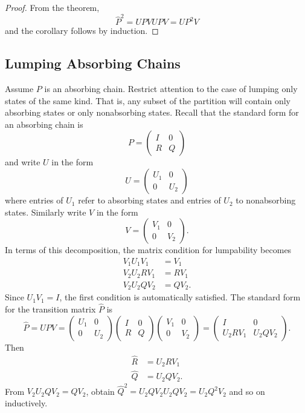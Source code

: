 \documentclass[12pt]{article}
\begin{document}
\begin{proof}
    From the theorem,
    \[
        \hat{P}^2 = U P V U P V = U P^2 V
    \] and the corollary follows by induction.
\end{proof}

\subsection*{Lumping Absorbing Chains}

Assume \( P \) is an absorbing chain.  Restrict attention to the case of
lumping only states of the same kind.  That is, any subset of the
partition will contain only absorbing states or only nonabsorbing
states.  Recall that the standard form for an absorbing chain is
\[
    P =
    \begin{pmatrix}
        I & 0 \\
        R & Q
    \end{pmatrix}
\] and write \( U \) in the form
\[
    U =
    \begin{pmatrix}
        U_1 & 0 \\
        0 & U_{2}
    \end{pmatrix}
\] where entries of \( U_1 \) refer to absorbing states and entries of \(
U_2 \) to nonabsorbing states.  Similarly write \( V \) in the form
\[
    V =
    \begin{pmatrix}
        V_1 & 0 \\
        0 & V_{2}
    \end{pmatrix}
    .
\] In terms of this decomposition, the matrix condition for lumpability
becomes
\begin{align*}
    V_1 U_1 V_1 &= V_1 \\
    V_2 U_2 R V_1 &= R V_1 \\
    V_2 U_2 Q V_2 &= Q V_2.
\end{align*}
Since \( U_1 V_1 = I \), the first condition is automatically satisfied.
The standard form for the transition matrix \( \hat{P} \) is
\[
    \hat{P} = UPV =
    \begin{pmatrix}
        U_1 & 0 \\
        0 & U_{2}
    \end{pmatrix}
    \begin{pmatrix}
        I & 0 \\
        R & Q
    \end{pmatrix}
    \begin{pmatrix}
        V_1 & 0 \\
        0 & V_{2}
    \end{pmatrix}
    =
    \begin{pmatrix}
        I & 0 \\
        U_2 R V_1 & U_2 Q V_2
    \end{pmatrix}
    .
\] Then
\begin{align*}
    \hat{R} &= U_2 R V_1 \\
    \hat{Q} &= U_2 Q V_2.
\end{align*}
From \( V_2 U_2 Q V_2 = Q V_2 \), obtain \( \hat{Q}^2 = U_2 Q V_2 U_2 Q
V_2 = U_2 Q^2 V_2 \) and so on inductively.
\end{document}
